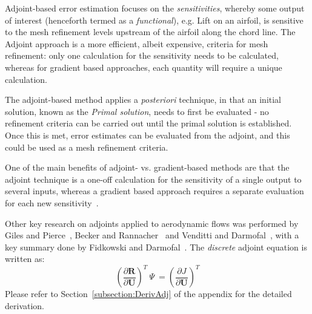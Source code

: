 Adjoint-based error estimation focuses on the \textit{sensitivities}, whereby some output of interest (henceforth termed as a \textit{functional}), e.g. Lift on an airfoil, is sensitive to the mesh refinement levels upstream of the airfoil along the chord line. The Adjoint approach is a more efficient, albeit expensive, criteria for mesh refinement: only one calculation for the sensitivity needs to be calculated, whereas for gradient based approaches, each quantity will require a unique calculation.\par

The adjoint-based method applies a \textit{posteriori} technique, in that an initial solution, known as the \textit{Primal solution}, needs to first be evaluated - no refinement criteria can be carried out until the primal solution is established. Once this is met, error estimates can be evaluated from the adjoint, and this could be used as a mesh refinement criteria. \par

One of the main benefits of adjoint- vs. gradient-based methods are that the adjoint technique is a one-off calculation for the sensitivity of a single output to several inputs, whereas a gradient based approach requires a separate evaluation for each new sensitivity~\cite{Giles:2000}.

Other key research on adjoints applied to aerodynamic flows was performed by Giles and Pierce~\cite{Giles:2000}, Becker and Rannacher~\cite{Becker:2001} and Venditti and Darmofal~\cite{Venditti:2003}, with a key summary done by Fidkowski and Darmofal~\cite{Fidkowski:2011}. The \textit{discrete} adjoint equation is written as:
\begin{equation}
\left( \frac{\partial \textbf{R}}{\partial \textbf{U}} \right)^T ~\Psi~ = \left(\frac{\partial J}{\partial \textbf{U}}\right)^T
\end{equation}
Please refer to Section~\ref{subsection:DerivAdj} of the appendix for the detailed derivation.\par

